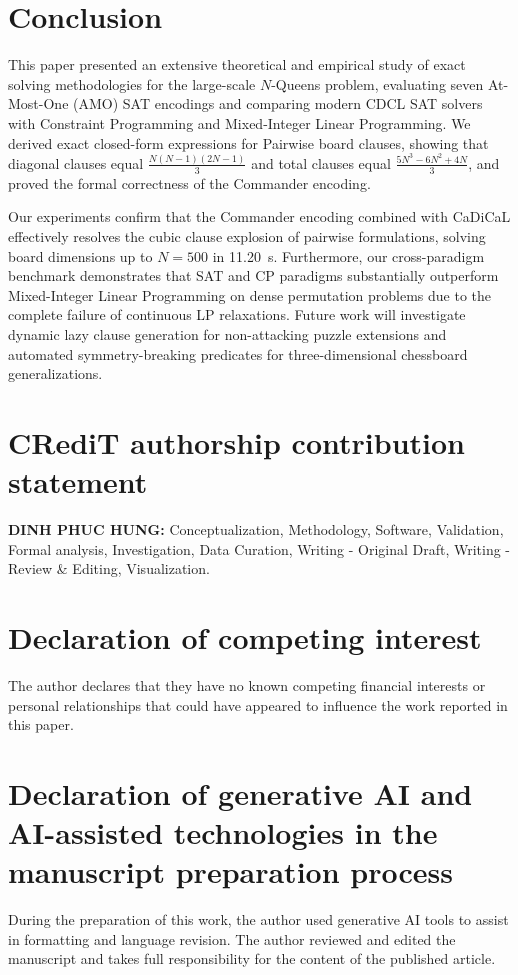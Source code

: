 \documentclass[a4paper,fleqn]{cas-sc}
\begin{document}
\section{Conclusion}
\label{sec:conclusion}

This paper presented an extensive theoretical and empirical study of exact solving methodologies for the large-scale $N$-Queens problem, evaluating seven At-Most-One (AMO) SAT encodings and comparing modern CDCL SAT solvers with Constraint Programming and Mixed-Integer Linear Programming. We derived exact closed-form expressions for Pairwise board clauses, showing that diagonal clauses equal $\frac{N(N-1)(2N-1)}{3}$ and total clauses equal $\frac{5N^3 - 6N^2 + 4N}{3}$, and proved the formal correctness of the Commander encoding. 

Our experiments confirm that the Commander encoding combined with CaDiCaL effectively resolves the cubic clause explosion of pairwise formulations, solving board dimensions up to $N = 500$ in 11.20~s. Furthermore, our cross-paradigm benchmark demonstrates that SAT and CP paradigms substantially outperform Mixed-Integer Linear Programming on dense permutation problems due to the complete failure of continuous LP relaxations. Future work will investigate dynamic lazy clause generation for non-attacking puzzle extensions and automated symmetry-breaking predicates for three-dimensional chessboard generalizations.

\section*{CRediT authorship contribution statement}
\textbf{DINH PHUC HUNG:} Conceptualization, Methodology, Software, Validation, Formal analysis, Investigation, Data Curation, Writing - Original Draft, Writing - Review \& Editing, Visualization.

\section*{Declaration of competing interest}
The author declares that they have no known competing financial interests or personal relationships that could have appeared to influence the work reported in this paper.

\section*{Declaration of generative AI and AI-assisted technologies in the manuscript preparation process}
During the preparation of this work, the author used generative AI tools to assist in formatting and language revision. The author reviewed and edited the manuscript and takes full responsibility for the content of the published article.
\end{document}
